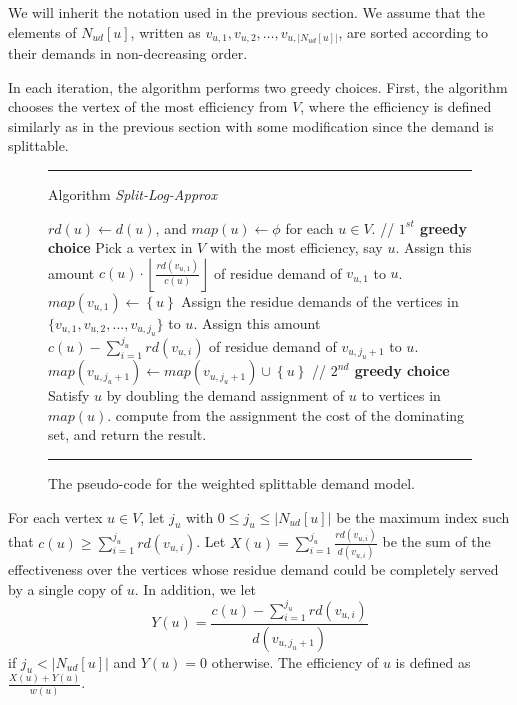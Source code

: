 \documentclass[a4paper,11pt]{article}
\theoremstyle{definition}
\begin{document}
\smallskip

We will inherit the notation used in the previous
section. We assume that the elements of $N_{ud}[u]$,
written as $v_{u,1},v_{u,2}, \ldots ,v_{u,|N_{ud}[u]|}$, are sorted according to
their demands in non-decreasing order.

\smallskip

In each iteration, the algorithm performs two greedy choices. First, the
algorithm chooses the vertex of the most efficiency from $V$, where
the efficiency is defined similarly as in the previous section with some modification since the demand is splittable.

\begin{figure*}[t]
\rule{\linewidth}{0.2mm}
\medskip
{{\sc Algorithm} {\em Split-Log-Approx}}

\begin{algorithmic}[1]
\STATE $rd(u) \longleftarrow d(u)$, and $map(u) \longleftarrow \phi$ for each $u \in V$.
    \STATE // {\bf $1^{st}$ greedy choice}
    \STATE Pick a vertex in $V$ with the most efficiency, say $u$.
        \STATE Assign this amount $c(u)\cdot \left\lfloor \frac{rd(v_{u,1})}{c(u)} \right\rfloor$ of residue demand of $v_{u,1}$ to $u$.
        \STATE $map(v_{u,1}) \longleftarrow \left\{u\right\}$
    \ELSE
        \STATE Assign the residue demands of the vertices in $\{v_{u,1}, v_{u,2}, \ldots, v_{u,j_u}\}$ to $u$.
            \STATE Assign this amount $c(u)-\sum_{i=1}^{j_u}rd(v_{u,i})$ of residue demand of $v_{u,j_u+1}$ to $u$.
            \STATE $map(v_{u,j_u+1}) \longleftarrow map(v_{u,j_u+1}) \cup \left\{u\right\}$
        \ENDIF
    \ENDIF
    \STATE
    \STATE // {\bf $2^{nd}$ greedy choice}
        \STATE Satisfy $u$ by doubling the demand assignment of $u$ to vertices in $map(u)$.
    \ENDIF
\ENDWHILE
\STATE compute from the assignment the cost of the dominating set, and return the result.

\end{algorithmic}
\rule{\linewidth}{0.2mm} \caption{The pseudo-code for the 
weighted splittable demand model.} \label{Algorithm for
Weighted Splittable Demand}
\end{figure*}

\smallskip

For each vertex $u \in V$, let $j_u$ with $0 \le j_u \le \left|N_{ud}[u]\right|$ be the maximum index such that
$c(u) \ge \sum_{i=1}^{j_u}rd(v_{u,i})$.
Let $X(u) = \sum_{i=1}^{j_u}\frac{rd(v_{u,i})}{d(v_{u,i})}$ be the sum of the effectiveness over the vertices whose residue demand could be completely served by a single copy of $u$. In addition, we let $$Y(u) = \frac{c(u)-\sum_{i=1}^{j_u}rd(v_{u,i})}{d(v_{u,j_u+1})}$$ if $j_u < \left|N_{ud}[u]\right|$ and $Y(u) = 0$ otherwise. The efficiency of $u$ is defined as $\frac{X(u)+Y(u)}{w(u)}$.
\end{document}
